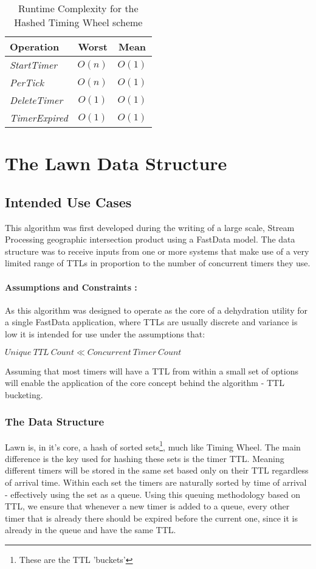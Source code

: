 \documentclass[twocolumn,a4paper]{article}
\newcommand{\advcomplexity}[9]{
\begin{table}[h!]
	\begin{center}
		\begin{tabular}{l|c|c}
			\textbf{Operation} & \textbf{Worst} & \textbf{Mean} \\
			\hline
			\textit{StartTimer} & $O(#1)$ & $O(#2)$ \\
			\textit{PerTick} & $O(#3)$ & $O(#4)$ \\
			\textit{DeleteTimer} & $O(#5)$ & $O(#6)$ \\
			\textit{TimerExpired} & $O(#7)$ & $O(#8)$ \\
		\end{tabular}
		\caption{Runtime Complexity for #9 scheme}
		\label{tab:table1}
	\end{center}
\end{table}
}
\begin{document}
\advcomplexity{n}{1}{n}{1}{1}{1}{1}{1}{the Hashed Timing Wheel}


\section{The Lawn Data Structure}
 
\subsection{Intended Use Cases}

This algorithm was first developed during the writing of a large scale, Stream Processing geographic intersection product using a FastData\cite{GP} model. The data structure was to receive inputs from one or more systems that make use of a very limited range of TTLs in proportion to the number of concurrent timers they use. 

\paragraph{Assumptions and Constraints :}
As this algorithm was designed to operate as the core of a dehydration utility for a single FastData application, where TTLs are usually discrete and variance is low it is intended for use under the assumptions that: 
\begin{center}
	$ Unique\ TTL\ Count \ll Concurrent\ Timer\ Count $
\end{center}
Assuming that most timers will have a TTL from within a small set of options will enable the application of the core concept behind the algorithm - TTL bucketing. 

\subsubsection{The Data Structure}
Lawn is, in it's core, a hash of sorted sets\footnote{These are the TTL 'buckets'}, much like Timing Wheel. The main difference is the key used for hashing these sets is the timer TTL. Meaning different timers will be stored in the same set based only on their TTL regardless of arrival time. Within each set the timers are naturally sorted by time  of arrival - effectively using the set as a queue. Using this queuing methodology based on TTL, we ensure that whenever a new timer is added to a queue, every other timer that is already there should be expired before the current one, since it is already in the queue and have the same TTL.
\end{document}
